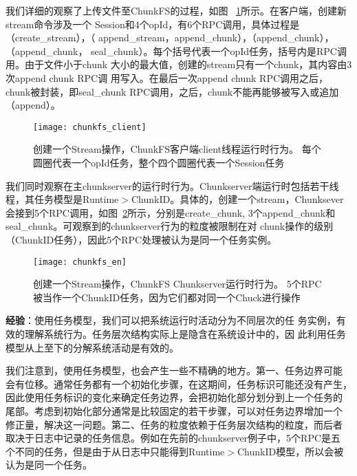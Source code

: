 我们详细的观察了上传文件至ChunkFS的过程，如图~
\ref{fig:chunkfs_client}所示。在客户端，创建新stream命令涉及一个
Session和4个opId，有6个RPC调用，具体过程是（create\_stream），（
append\_stream，append\_chunk），（append\_chunk），（append\_chunk，
seal\_chunk）。每个括号代表一个opId任务，括号内是RPC调用。由于文件小于chunk
大小的最大值，创建的stream只有一个chunk，其内容由3次append chunk RPC调
用写入。在最后一次append chunk RPC调用之后，chunk被封装，即seal\_chunk
RPC调用，之后，chunk不能再能够被写入或追加（append）。

\begin{figure}
  \centering
  \begin{minipage}{0.8\linewidth}
    \centering
    \texttt{[image: chunkfs\_client]}
    \caption{创建一个Stream操作，ChunkFS客户端client线程运行时行为。
    每个圆圈代表一个opId任务，整个四个圆圈代表一个Session任务}
    \label{fig:chunkfs_client}
  \end{minipage}
\end{figure}


我们同时观察在主chunkserver的运行时行为。Chunkserver端运行时包括若干线
程，其任务模型是Runtime$>$ChunkID。具体的，创建一个stream，Chunksever
会接到5个RPC调用，如图~\ref{fig:chunkserver}所示，分别是create\_chunk,
3个append\_chunk和seal\_chunk。可观察到的chunkserver行为的粒度被限制在对
chunk操作的级别（ChunkID任务），因此5个RPC处理被认为是同一个任务实例。

\begin{figure}
  \centering
  \begin{minipage}{0.8\linewidth}
    \centering
    \texttt{[image: chunkfs\_en]}
    \caption{创建一个Stream操作，ChunkFS Chunkserver运行时行为。
    5个RPC被当作一个ChunkID任务，因为它们都对同一个Chuck进行操作}
    \label{fig:chunkserver}
  \end{minipage}
\end{figure}



\textbf{经验}：使用任务模型，我们可以把系统运行时活动分为不同层次的任
务实例，有效的理解系统行为。任务层次结构实际上是隐含在系统设计中的，因
此利用任务模型从上至下的分解系统活动是有效的。

我们注意到，使用任务模型，也会产生一些不精确的地方。第一、任务边界可能
会有位移。通常任务都有一个初始化步骤，在这期间，任务标识可能还没有产生，
因此使用任务标识的变化来确定任务边界，会把初始化部分划分到上一个任务的
尾部。考虑到初始化部分通常是比较固定的若干步骤，可以对任务边界增加一个
修正量，解决这一问题。第二、任务的粒度依赖于任务层次结构的粒度，而后者
取决于日志中记录的任务信息。例如在先前的chunkserver例子中，5个RPC是五
个不同的任务，但是由于从日志中只能得到Runtime$>$ChunkID模型，所以会被
认为是同一个任务。

